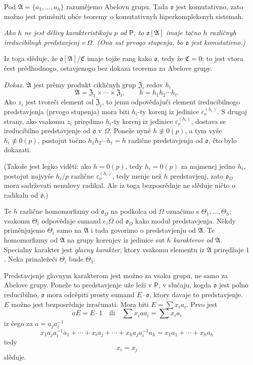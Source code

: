 \documentclass[11pt]{article}
\begin{document}
Pod \(\mathfrak A=\{a_1,\ldots,a_h\}\) razumějemo Abelovu grupu. Tada \(\mathfrak o\) jest komutativno, zato možno jest priměniti obće teoremy o komutativnyh hiperkompleksnyh sistemah.

\emph{Ako \(h\) ne jest dělivy karakteristikoju \(p\) od \(\mathsf P\), to \(\mathfrak o[\mathfrak A]\) imaje točno \(h\) različnyh ireducibilnyh predstavjenj v \(\Omega\). (Ona sut prvogo stupenja, bo \(\mathfrak o\) jest komutativno.)}

Iz toga slěduje, že \(\mathfrak o[\mathfrak A]/\mathfrak C\) imaje tojže rang kako \(\mathfrak o\), tedy že \(\mathfrak C=0\); to jest vtora čest prědhodnogo, ostavjenogo bez dokaza teorema za Abelove grupy.

\emph{Dokaz.} \(\mathfrak A\) jest prěmy produkt cikličnyh grup \(\mathfrak Z_i\) redov \(h_i\)
\[
\mathfrak A=\mathfrak Z_1\times\cdots\times\mathfrak Z_t,\qquad
h=h_1h_2\cdots h_t .
\]
Ako \(z_i\) jest tvoreči element od \(\mathfrak Z_i\), to jemu odpovědajuči element ireducibilnogo predstavjenja (prvogo stupenja) mora biti \(h_i\)-ty korenj iz jedinice \(\varepsilon_\nu^{(h_i)}\). S drugoj strany, ako vsakomu \(z_i\) prirędimo \(h_i\)-ty korenj iz jedinice \(\varepsilon_\nu^{(h_i)}\), dostava se ireducibilno predstavjenje od \(\mathfrak o\) v \(\Omega\). Poneže nyně \(h\not\equiv0(p)\), a tym vyše \(h_i\not\equiv0(p)\), postojut točno \(h_1h_2\cdots h_t=h\) različne predstavjenja od \(\mathfrak o\), čto bylo dokazati.

(Takože jest legko viděti: ako \(h=0(p)\), tedy \(h_i=0(p)\) za najmenej jedno \(h_i\), postojut najvyše \(h_i/p\) različne \(\varepsilon_\nu^{(h_i)}\), tedy menje než \(h\) predstavjenj, zato \(\mathfrak o_\Omega\) mora sadrževati nenulovy radikal. Ale iz toga bezposrědnje ne slěduje ničto o radikalu od \(\mathfrak o\).)

Te \(h\) različne homomorfizmy od \(\mathfrak o_\Omega\) na podkolca od \(\Omega\) označimo s \(\Theta_1,\ldots,\Theta_h\); vsakomu \(\Theta_i\) odpovědaje sumand \(e_i\Omega\) od \(\mathfrak o_\Omega\) kako modul predstavjenja. Někdy priměnjujemo \(\Theta_i\) samo na \(\mathfrak A\) i tada govorimo o predstavjenju od \(\mathfrak A\). Te homomorfizmy od \(\mathfrak A\) na grupy korenjev iz jedinice sut \emph{\(h\) karakterov od \(\mathfrak A\)}. Specialny karakter jest \emph{glavny karakter}, ktory vsakomu elementu iz \(\mathfrak A\) prirędžaje \(1\). Neka prinaležeči \(\Theta_i\) bude \(\Theta_1\).

Predstavjenje glavnym karakterom jest možno za vsaku grupu, ne samo za Abelove grupy. Poneže to predstavjenje uže leži v \(\mathsf P\), v slučaju, kogda \(\mathfrak o\) jest polno reducibilno, \(\mathfrak o\) mora odcěpiti prosty sumand \(E\cdot\mathfrak o\), ktory davaje to predstavjenje. \(E\) možno jest bezposrědnje izračunati. Mora biti \(E=\sum x_i a_i\). Prvo jest
\[
aE=E\cdot 1\quad\text{ili}\quad \sum x_i a a_i=\sum x_i a_i
\]
iz čego za \(a=a_j a_i^{-1}\)
\[
x_1a_ja_i^{-1}a_1+\cdots+x_i a_j+\cdots+x_ha_ja_i^{-1}a_h
=x_1a_1+\cdots+x_ha_h
\]
tedy
\[
x_i=x_j
\]
slěduje.
\end{document}
